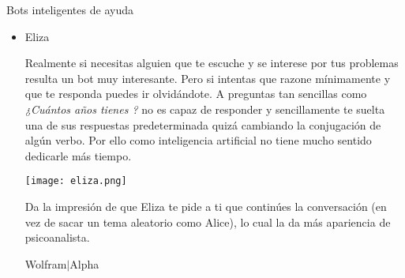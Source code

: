 \documentclass[spanish, a4paper, 12pt]{article} 	%
\begin{document}
\begin{section}{Bots inteligentes de ayuda}
\begin{itemize}
\begin{itemize}
			+ALICE: Let's think of a name for your problem, like "purple". Think of what it is like when you are purpling.
			
			(Parece que cuando llega a un punto muerto trata de cambiar el tema de conversación, eligiendo uno de una base de datos predeterminada.)
			
		\end{itemize}
		\item{Eliza}
		
	Realmente si necesitas alguien que te escuche y se interese por tus problemas resulta un bot muy interesante. Pero si intentas que razone mínimamente y que te responda puedes ir olvidándote. A preguntas tan sencillas como  \textit{¿Cuántos años tienes ?} no es capaz de responder y sencillamente te suelta una de sus respuestas predeterminada quizá cambiando la conjugación de algún verbo. Por ello como inteligencia artificial no tiene mucho sentido dedicarle más tiempo.
	
		\begin{center}
		\texttt{[image: eliza.png]}
		\end{center}	
	Da la impresión de que Eliza te pide a ti que continúes la conversación (en vez de sacar un tema aleatorio como Alice), lo cual la da más apariencia de psicoanalista.
	
\begin{section}{Wolfram$\vert$Alpha}
	
	
	
\end{section}
	
	\end{itemize}
\end{section}
\end{document}

